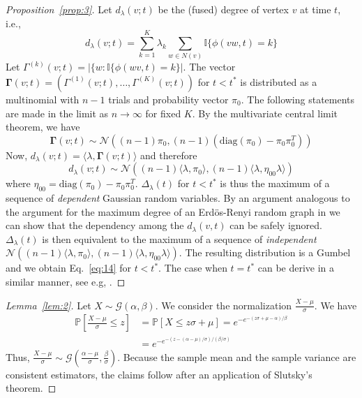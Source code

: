 \documentclass[draftcls]{IEEEtran}
\theoremstyle{definition}
\begin{document}
\begin{proof}[Proposition~\ref{prop:3}]
  Let $d_{\lambda}(v;t)$ be the (fused) degree of vertex $v$ at time
  $t$, i.e.,
  \begin{equation*}
    d_{\lambda}(v;t) = \sum_{k = 1}^{K} \lambda_k \sum_{w \in N(v)}
    \mathbb{I}\{ \phi(vw,t) = k \}
  \end{equation*}
  Let $\Gamma^{(k)}(v;t) = |\{w \colon \mathbb{I}\{\phi(wv,t) =
  k\}|$. The vector $\bm{\Gamma}(v;t) = (\Gamma^{(1)}(v;t), \dots,
  \Gamma^{(K)}(v;t))$ for $t < t^{*}$ is distributed as a multinomial
  with $n-1$ trials and probability vector $\pi_0$. The following
  statements are made in the limit as $n \rightarrow \infty$ for fixed
  $K$. By the multivariate
  central limit theorem, we have
  \begin{equation*}
    \bm{\Gamma}(v;t) \sim \mathcal{N}((n-1)\pi_0,
    (n-1)(\mathrm{diag}(\pi_0) - \pi_0 \pi_0^{T}))
  \end{equation*}
  Now, $d_{\lambda}(v;t) = \langle \lambda, \bm{\Gamma}(v;t) \rangle$
  and therefore
  \begin{equation}
    \label{eq:12}
    d_{\lambda}(v;t) \sim \mathcal{N}((n-1) \langle \lambda, \pi_0
    \rangle, (n-1) \langle \lambda, \eta_{00} \lambda \rangle)
  \end{equation}
  where $\eta_{00} = \mathrm{diag}(\pi_0) - \pi_0
  \pi_0^{T}$. $\Delta_{\lambda}(t)$ for $t < t^{*}$ is thus the
  maximum of a sequence of {\em dependent} Gaussian random
  variables. By an argument analogous to the argument for the maximum
  degree of an Erd\"{o}s-Renyi random graph in \cite[\S
  III.1]{bollobas85:_random_graph} we can show that the dependency
  among the $d_{\lambda}(v,t)$ can be safely
  ignored. $\Delta_{\lambda}(t)$ is then equivalent to the maximum of
  a sequence of {\em independent} $\mathcal{N}((n-1) \langle \lambda,
  \pi_0 \rangle, (n-1) \langle \lambda, \eta_{00} \lambda
  \rangle)$. The resulting distribution is a Gumbel \cite[\S
  2.3]{galambos87:_asymp_theor_extrem_order_statis} and we obtain 
  Eq.~\eqref{eq:14} for $t < t^{*}$. The case when $t = t^{*}$ can be
  derive in a similar manner, see e.g,
  \cite{rukhin:_limit_distr_graph_scan_statis}.
\end{proof}
\begin{proof}[Lemma~\ref{lem:2}]
  Let $ X \sim \mathcal{G}(\alpha, \beta)$. We consider the
  normalization $\tfrac{X - \mu}{\sigma}$. We have
  \begin{equation*}
    \begin{split}
    \mathbb{P}[ \frac{X - \mu}{\sigma} \leq z]  &= \mathbb{P}[X \leq z
    \sigma + \mu] 
    = e^{-e^{-(z \sigma + \mu - \alpha)/\beta}} \\
      &= e^{- e^{-(z - (\alpha - \mu)/\sigma)/(\beta/\sigma)}}
    \end{split}
  \end{equation*}
  Thus, $\tfrac{X - \mu}{\sigma} \sim \mathcal{G}(\tfrac{\alpha -
    \mu}{\sigma}, \tfrac{\beta}{\sigma})$. Because the sample
  mean and the sample variance are consistent estimators, the claims
  follow after an application of Slutsky's theorem.
\end{proof}

\end{document}
